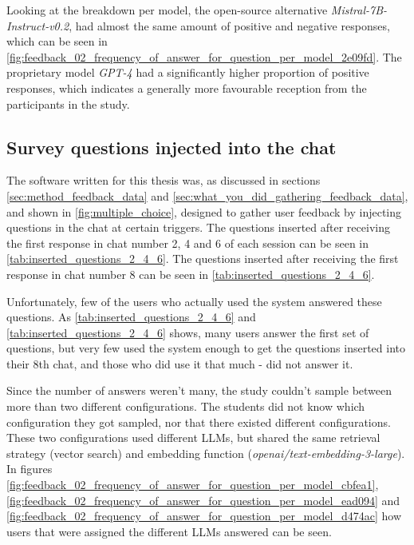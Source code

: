 Looking at the breakdown per model, the open-source alternative \textit{Mistral-7B-Instruct-v0.2}, had almost the same amount of positive and negative responses, which can be seen in \autoref{fig:feedback_02_frequency_of_answer_for_question_per_model_2e09fd}. The proprietary model \textit{GPT-4} had a significantly higher proportion of positive responses, which indicates a generally more favourable reception from the participants in the study.


\subsection{Survey questions injected into the chat}
\label{sec:survey_questions_injected_into_the_chat}


The software written for this thesis was, as discussed in sections \ref{sec:method_feedback_data} and \ref{sec:what_you_did_gathering_feedback_data}, and shown in \autoref{fig:multiple_choice}, designed to gather user feedback by injecting questions in the chat at certain triggers. The questions inserted after receiving the first response in chat number 2, 4 and 6 of each session can be seen in \autoref{tab:inserted_questions_2_4_6}. The questions inserted after receiving the first response in chat number 8 can be seen in \autoref{tab:inserted_questions_2_4_6}.


Unfortunately, few of the users who actually used the system answered these questions. As \autoref{tab:inserted_questions_2_4_6} and \autoref{tab:inserted_questions_2_4_6} shows, many users answer the first set of questions, but very few used the system enough to get the questions inserted into their 8th chat, and those who did use it that much - did not answer it.








Since the number of answers weren't many, the study couldn’t sample between more than two different configurations. The students did not know which configuration they got sampled, nor that there existed different configurations. These two configurations used different \gls{LLM}s, but shared the same retrieval strategy (vector search) and embedding function (\textit{openai/text-embedding-3-large}). In figures \ref{fig:feedback_02_frequency_of_answer_for_question_per_model_cbfea1}, \ref{fig:feedback_02_frequency_of_answer_for_question_per_model_ead094} and \ref{fig:feedback_02_frequency_of_answer_for_question_per_model_d474ac} how users that were assigned the different \gls{LLM}s answered can be seen.


